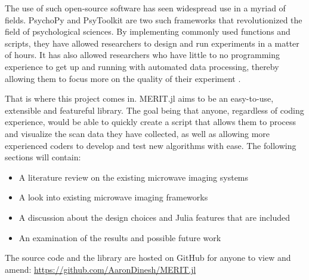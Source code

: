 The use of such open-source software has seen widespread use in a myriad of fields. PsychoPy and PsyToolkit are two such
frameworks that revolutionized the field of psychological sciences. By implementing commonly used functions and scripts,
they have allowed researchers to design and run experiments in a matter of hours. It has also allowed researchers who
have little to no programming experience to get up and running with automated data processing, thereby allowing them to
focus more on the quality of their experiment \cite{stoetPsyToolkitTestimonials}. \hfill \break

That is where this project comes in. MERIT.jl aims to be an easy-to-use, extensible and featureful library. The goal
being that anyone, regardless of coding experience, would be able to quickly create a script that allows them to process
and visualize the scan data they have collected, as well as allowing more experienced coders to develop and test new
algorithms with ease. The following sections will contain: 

\begin{itemize}
    \item A literature review on the existing microwave imaging systems
    \item A look into existing microwave imaging frameworks
    \item A discussion about the design choices and Julia features that are included
    \item An examination of the results and possible future work
\end{itemize}

The source code and the library are hosted on GitHub for anyone to view and amend:
\url{https://github.com/AaronDinesh/MERIT.jl}
